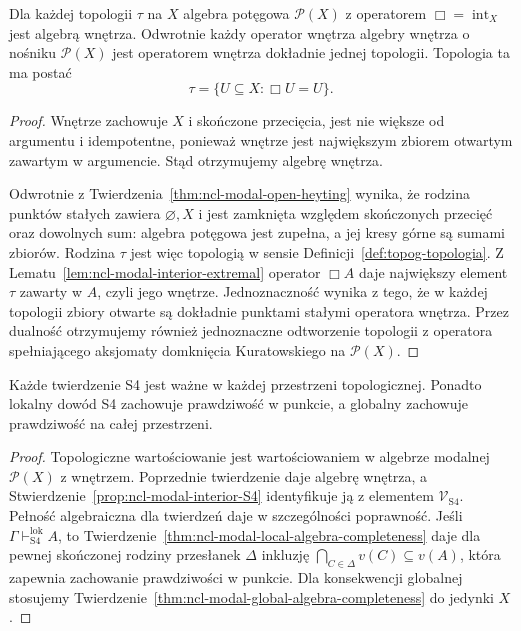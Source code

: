 \begin{twierdzenie}
\label{thm:ncl-modal-topological-kuratowski}
Dla każdej topologii $\tau$ na $X$ algebra
potęgowa $\mathcal P(X)$ z operatorem
$\Box=\operatorname{int}_X$ jest algebrą wnętrza.
Odwrotnie każdy operator wnętrza algebry
wnętrza o nośniku $\mathcal P(X)$ jest
operatorem wnętrza dokładnie jednej topologii.
Topologia ta ma postać
\[
 \tau=\{U\subseteq X:\Box U=U\}.
\]
\end{twierdzenie}
\begin{proof}
Wnętrze zachowuje $X$ i skończone przecięcia,
jest nie większe od argumentu i idempotentne,
ponieważ wnętrze jest największym zbiorem
otwartym zawartym w argumencie. Stąd
otrzymujemy algebrę wnętrza.

Odwrotnie z
Twierdzenia~\ref{thm:ncl-modal-open-heyting}
wynika, że rodzina punktów stałych zawiera
$\varnothing,X$ i jest zamknięta względem
skończonych przecięć oraz dowolnych sum:
algebra potęgowa jest zupełna, a jej kresy
górne są sumami zbiorów.
Rodzina $\tau$ jest więc topologią
w sensie Definicji~\ref{def:topog-topologia}.
Z Lematu~\ref{lem:ncl-modal-interior-extremal}
operator $\Box A$ daje największy element
$\tau$ zawarty w $A$, czyli jego wnętrze.
Jednoznaczność wynika z tego, że w każdej
topologii zbiory otwarte są dokładnie
punktami stałymi operatora wnętrza.
Przez dualność otrzymujemy również
jednoznaczne odtworzenie topologii
z operatora spełniającego aksjomaty
domknięcia Kuratowskiego na $\mathcal P(X)$.
\end{proof}

\begin{wniosek}
\label{cor:ncl-modal-S4-topological-soundness}
Każde twierdzenie S4 jest ważne w każdej
przestrzeni topologicznej.
Ponadto lokalny dowód S4 zachowuje
prawdziwość w punkcie, a globalny
zachowuje prawdziwość na całej przestrzeni.
\end{wniosek}
\begin{proof}
Topologiczne wartościowanie jest wartościowaniem
w algebrze modalnej $\mathcal P(X)$ z wnętrzem.
Poprzednie twierdzenie daje algebrę wnętrza,
a Stwierdzenie~\ref{prop:ncl-modal-interior-S4}
identyfikuje ją z elementem $\mathcal V_{\mathrm{S4}}$.
Pełność algebraiczna dla twierdzeń daje
w szczególności poprawność.
Jeśli $\Gamma\vdash_{\mathrm{S4}}^{\mathrm{lok}}A$,
to Twierdzenie~\ref{thm:ncl-modal-local-algebra-completeness}
daje dla pewnej skończonej rodziny przesłanek
$\Delta$ inkluzję
$\bigcap_{C\in\Delta}v(C)\subseteq v(A)$,
która zapewnia zachowanie prawdziwości w punkcie.
Dla konsekwencji globalnej stosujemy
Twierdzenie~\ref{thm:ncl-modal-global-algebra-completeness}
do jedynki $X$.
\end{proof}

